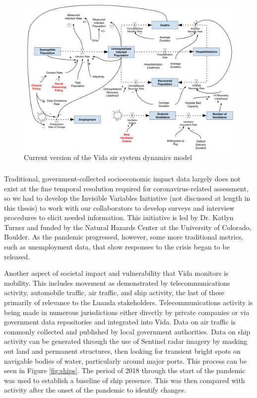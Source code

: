\begin{figure}[h]
	\centering
	\includegraphics[scale=0.25]{Figures/chap5/SD_diagram.jpg}
	\caption[Current version of the Vida SIR system dynamics model]{Current version of the Vida \ac{sir} system dynamics model}
	\label{fig:vida_sd}
\end{figure}


\subsubsection{}

Traditional, government-collected socioeconomic impact data largely does not exist at the fine temporal resolution required for coronavirus-related assessment, so we had to develop the Invisible Variables Initiative (not discussed at length in this thesis) to work with our collaborators to develop surveys and interview procedures to elicit needed information. This initiative is led by Dr. Katlyn Turner and funded by the Natural Hazards Center at the University of Colorado, Boulder. As the pandemic progressed, however, some more traditional metrics, such as unemployment data, that show responses to the crisis began to be released.

Another aspect of societal impact and vulnerability that Vida monitors is mobility. This includes movement as demonstrated by telecommunications activity, automobile traffic, air traffic, and ship activity, the last of these primarily of relevance to the Luanda stakeholders. Telecommunications activity is being made in numerous jurisdictions either directly by private companies \cite{googleCOVID19CommunityMobility} or via government data repositories \cite{ministeriodecienciatecnologiaconocimientoeinnovacionDatosCOVID192021} and integrated into Vida. Data on air traffic is commonly collected and published by local government authorities. Data on ship activity can be generated through the use of Sentinel radar imagery by masking out land and permanent structures, then looking for transient bright spots on navigable bodies of water, particularly around major ports. This process can be seen in Figure \ref{fig:ships}. The period of 2018 through the start of the pandemic was used to establish a baseline of ship presence. This was then compared with activity after the onset of the pandemic to identify changes. 

